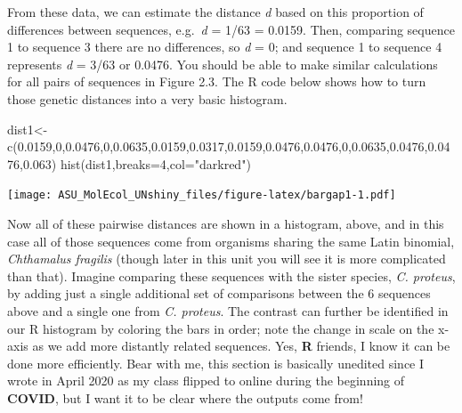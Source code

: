 \documentclass[
]{article}
\newenvironment{Shaded}{\begin{snugshade}}{\end{snugshade}}
\newcommand{\AttributeTok}[1]{\textcolor[rgb]{0.77,0.63,0.00}{#1}}
\newcommand{\DecValTok}[1]{\textcolor[rgb]{0.00,0.00,0.81}{#1}}
\newcommand{\FloatTok}[1]{\textcolor[rgb]{0.00,0.00,0.81}{#1}}
\newcommand{\FunctionTok}[1]{\textcolor[rgb]{0.00,0.00,0.00}{#1}}
\newcommand{\NormalTok}[1]{#1}
\newcommand{\OtherTok}[1]{\textcolor[rgb]{0.56,0.35,0.01}{#1}}
\newcommand{\StringTok}[1]{\textcolor[rgb]{0.31,0.60,0.02}{#1}}
\begin{document}
From these data, we can estimate the distance \emph{d} based on this
proportion of differences between sequences, e.g.~\emph{d} = 1/63 =
0.0159. Then, comparing sequence 1 to sequence 3 there are no
differences, so \emph{d} = 0; and sequence 1 to sequence 4 represents
\emph{d} = 3/63 or 0.0476. You should be able to make similar
calculations for all pairs of sequences in Figure 2.3. The R code below
shows how to turn those genetic distances into a very basic histogram.

\begin{Shaded}
\begin{Highlighting}[]
\NormalTok{dist1}\OtherTok{\textless{}{-}}\FunctionTok{c}\NormalTok{(}\FloatTok{0.0159}\NormalTok{,}\DecValTok{0}\NormalTok{,}\FloatTok{0.0476}\NormalTok{,}\DecValTok{0}\NormalTok{,}\FloatTok{0.0635}\NormalTok{,}\FloatTok{0.0159}\NormalTok{,}\FloatTok{0.0317}\NormalTok{,}\FloatTok{0.0159}\NormalTok{,}\FloatTok{0.0476}\NormalTok{,}\FloatTok{0.0476}\NormalTok{,}\DecValTok{0}\NormalTok{,}\FloatTok{0.0635}\NormalTok{,}\FloatTok{0.0476}\NormalTok{,}\FloatTok{0.0476}\NormalTok{,}\FloatTok{0.063}\NormalTok{)}
\FunctionTok{hist}\NormalTok{(dist1,}\AttributeTok{breaks=}\DecValTok{4}\NormalTok{,}\AttributeTok{col=}\StringTok{"darkred"}\NormalTok{)}
\end{Highlighting}
\end{Shaded}

\texttt{[image: ASU\_MolEcol\_UNshiny\_files/figure-latex/bargap1-1.pdf]}

Now all of these pairwise distances are shown in a histogram, above, and
in this case all of those sequences come from organisms sharing the same
Latin binomial, \emph{Chthamalus fragilis} (though later in this unit
you will see it is more complicated than that). Imagine comparing these
sequences with the sister species, \emph{C. proteus}, by adding just a
single additional set of comparisons between the 6 sequences above and a
single one from \emph{C. proteus}. The contrast can further be
identified in our R histogram by coloring the bars in order; note the
change in scale on the x-axis as we add more distantly related
sequences. Yes, \textbf{R} friends, I know it can be done more
efficiently. Bear with me, this section is basically unedited since I
wrote in April 2020 as my class flipped to online during the beginning
of \textbf{COVID}, but I want it to be clear where the outputs come
from!
\end{document}
